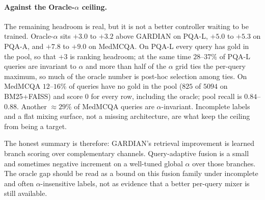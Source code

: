 \paragraph{Against the Oracle-$\alpha$ ceiling.}
The remaining headroom is real, but it is not a better controller waiting to
be trained. Oracle-$\alpha$ sits $+3.0$ to $+3.2$ above GARDIAN on PQA-L,
$+5.0$ to $+5.3$ on PQA-A, and $+7.8$ to $+9.0$ on MedMCQA. On PQA-L every
query has gold in the pool, so that $+3$ is ranking headroom; at the same
time $28$--$37\%$ of PQA-L queries are invariant to $\alpha$ and more than
half of the $\alpha$ grid ties the per-query maximum, so much of the oracle
number is post-hoc selection among ties. On MedMCQA $12$--$16\%$ of queries
have no gold in the pool ($825$ of $5094$ on BM25+FAISS) and score $0$ for every
row, including the oracle; pool recall is $0.84$--$0.88$. Another
$\approx 29\%$ of MedMCQA queries are $\alpha$-invariant. Incomplete labels
and a flat mixing surface, not a missing architecture, are what keep the
ceiling from being a target.

The honest summary is therefore: GARDIAN's retrieval improvement is learned
branch scoring over complementary channels. Query-adaptive fusion is a small
and sometimes negative increment on a well-tuned global $\alpha$ over those
branches. The oracle gap should be read as a bound on this fusion family
under incomplete and often $\alpha$-insensitive labels, not as evidence that
a better per-query mixer is still available.
